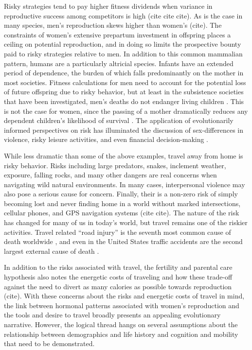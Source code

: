 Risky strategies tend to pay higher fitness dividends when variance in reproductive success among competitors is high (cite cite cite).  As is the case in many species, men's reproduction skews higher than women's (cite).  The constraints of women's extensive prepartum investment in offspring places a ceiling on potential reproduction, and in doing so limits the prospective bounty paid to risky strategies relative to men.  In addition to this common mammalian pattern, humans are a particularly altricial species.  Infants have an extended period of dependence, the burden of which falls predominantly on the mother in most societies.  Fitness calculations for men need to account for the potential loss of future offspring due to risky behavior, but at least in the subsistence societies that have been investigated, men's deaths do not endanger living children \cite{sear2008keeps}.  This is not the case for women, since the passing of a mother dramatically reduces any dependent children's likelihood of survival \cite{hill1996ache, sear2008keeps}.  The application of evolutionarily informed perspectives on risk has illuminated the discussion of sex-differences in violence, risky leisure activities, and even financial decision-making \cite{wilson1985competitiveness} \cite{wilson1997life} \cite{jianakoplos1998women}.

While less dramatic than some of the above examples, travel away from home is risky behavior.  Risks including large predators, snakes, inclement weather, exposure, falling rocks, and many other dangers are real concerns when navigating wild natural environments.  In many cases, interpersonal violence may also pose a serious cause for concern.  Finally, their is a non-zero risk of simply becoming lost and never finding home in a world without marked intersections, cellular phones, and GPS navigation systems (cite cite).  The nature of the risk has changed for many of us in today's world, but travel remains one of the riskier activities.  Travel related ``road injury'' is the seventh most common cause of death worldwide \cite{krug2000global}, and even in the United States traffic accidents are the second largest external cause of death \cite{sherry2010cdc}.  

In addition to the risks associated with travel, the fertility and parental care hypothesis also notes the energetic costs of traveling and how these trade-off against the need to divert as many calories as possible towards reproduction (cite).  With these concerns about the risks and energetic costs of travel in mind, the link between hormonal patterns associated with women's reproduction and the tools and desire to travel broadly presents an appealing evolutionary narrative.  However, the logical thread hangs on several assumptions about the relationship between demographics and life history and cognition and mobility that need to be demonstrated.

